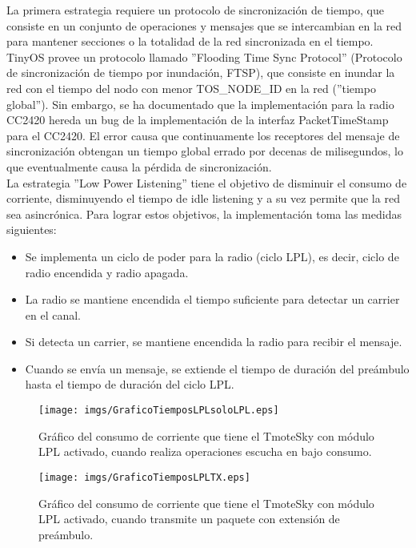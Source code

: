 La primera estrategia requiere un protocolo de sincronización de tiempo, que consiste en un conjunto de operaciones y mensajes que se intercambian en la red para mantener secciones o la totalidad de la red sincronizada en el tiempo. TinyOS provee un protocolo llamado ''Flooding Time Sync Protocol'' (Protocolo de sincronización de tiempo por inundación, FTSP), que consiste en inundar la red con el tiempo del nodo con menor TOS\_NODE\_ID en la red (''tiempo global''). Sin embargo, se ha documentado que la implementación para la radio CC2420 hereda un bug de la implementación de la interfaz PacketTimeStamp para el CC2420\cite{FtspBug}. El error causa que continuamente los receptores del mensaje de sincronización obtengan un tiempo global errado por decenas de milisegundos, lo que eventualmente causa la pérdida de sincronización.\\

La estrategia ''Low Power Listening'' tiene el objetivo de disminuir el consumo de corriente, disminuyendo el tiempo de idle listening y a su vez permite que la red sea asincrónica. Para lograr estos objetivos, la implementación toma las medidas siguientes:

\begin{itemize}
\item Se implementa un ciclo de poder para la radio (ciclo LPL), es decir, ciclo de radio encendida y radio apagada.
\item La radio se mantiene encendida el tiempo suficiente para detectar un carrier en el canal.
\item Si detecta un carrier, se mantiene encendida la radio para recibir el mensaje.
\item Cuando se envía un mensaje, se extiende el tiempo de duración del preámbulo hasta el tiempo de duración del ciclo LPL.
\end{itemize}

\begin{center}
\begin{figure}[H]
\centering
\texttt{[image: imgs/GraficoTiemposLPLsoloLPL.eps]} 
\caption{Gráfico del consumo de corriente que tiene el TmoteSky con módulo LPL activado, cuando realiza operaciones escucha en bajo consumo.}
\end{figure}
\end{center}

\begin{center}
\begin{figure}[H]
\centering
\texttt{[image: imgs/GraficoTiemposLPLTX.eps]} 
\caption{Gráfico del consumo de corriente que tiene el TmoteSky con módulo LPL activado, cuando transmite un paquete con extensión de preámbulo.}
\end{figure}
\end{center}

